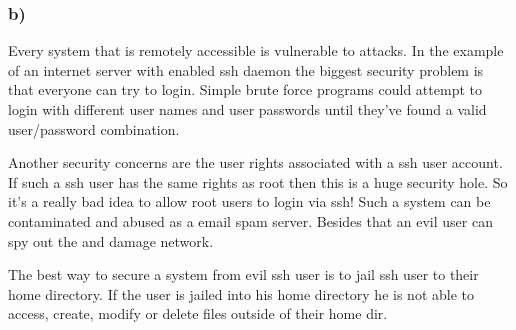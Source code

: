 \documentclass[12pt]{article}
\begin{document}
\subsubsection*{b)}
Every system that is remotely accessible is vulnerable to attacks. In the example of an internet server with enabled ssh daemon the biggest security problem is that everyone can try to login. Simple brute force programs could attempt to login with different user names and user passwords until they've found a valid user/password combination.

Another security concerns are the user rights associated with a ssh user account. If such a ssh user has the same rights as root then this is a huge security hole. So it's a really bad idea to allow root users to login via ssh! Such a system can be contaminated and abused as a email spam server. Besides that an evil user can spy out the and damage network. 

The best way to secure a system from evil ssh user is to jail ssh user to their home directory. If the user is jailed into his home directory he is not able to access, create, modify or delete files outside of their home dir.
 
\end{document}
